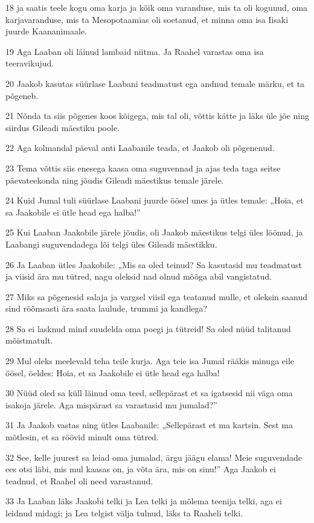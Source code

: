 \par 18 ja saatis teele kogu oma karja ja kõik oma varanduse, mis ta oli kogunud, oma karjavaranduse, mis ta Mesopotaamias oli soetanud, et minna oma isa Iisaki juurde Kaananimaale.
\par 19 Aga Laaban oli läinud lambaid niitma. Ja Raahel varastas oma isa teeravikujud.
\par 20 Jaakob kasutas süürlase Laabani teadmatust ega andnud temale märku, et ta põgeneb.
\par 21 Nõnda ta siis põgenes koos kõigega, mis tal oli, võttis kätte ja läks üle jõe ning siirdus Gileadi mäestiku poole.
\par 22 Aga kolmandal päeval anti Laabanile teada, et Jaakob oli põgenenud.
\par 23 Tema võttis siis enesega kaasa oma suguvennad ja ajas teda taga seitse päevateekonda ning jõudis Gileadi mäestikus temale järele.
\par 24 Kuid Jumal tuli süürlase Laabani juurde öösel unes ja ütles temale: „Hoia, et sa Jaakobile ei ütle head ega halba!”
\par 25 Kui Laaban Jaakobile järele jõudis, oli Jaakob mäestikus telgi üles löönud, ja Laabangi suguvendadega lõi telgi üles Gileadi mäestikku.
\par 26 Ja Laaban ütles Jaakobile: „Mis sa oled teinud? Sa kasutasid mu teadmatust ja viisid ära mu tütred, nagu oleksid nad olnud mõõga abil vangistatud.
\par 27 Miks sa põgenesid salaja ja vargsel viisil ega teatanud mulle, et oleksin saanud sind rõõmsasti ära saata laulude, trummi ja kandlega?
\par 28 Sa ei lasknud mind suudelda oma poegi ja tütreid! Sa oled nüüd talitanud mõistmatult.
\par 29 Mul oleks meelevald teha teile kurja. Aga teie isa Jumal rääkis minuga eile öösel, öeldes: Hoia, et sa Jaakobile ei ütle head ega halba!
\par 30 Nüüd oled sa küll läinud oma teed, sellepärast et sa igatsesid nii väga oma isakoja järele. Aga mispärast sa varastasid mu jumalad?”
\par 31 Ja Jaakob vastas ning ütles Laabanile: „Sellepärast et ma kartsin. Sest ma mõtlesin, et sa röövid minult oma tütred.
\par 32 See, kelle juurest sa leiad oma jumalad, ärgu jäägu elama! Meie suguvendade ees otsi läbi, mis mul kaasas on, ja võta ära, mis on sinu!” Aga Jaakob ei teadnud, et Raahel oli need varastanud.
\par 33 Ja Laaban läks Jaakobi telki ja Lea telki ja mõlema teenija telki, aga ei leidnud midagi; ja Lea telgist välja tulnud, läks ta Raaheli telki.
